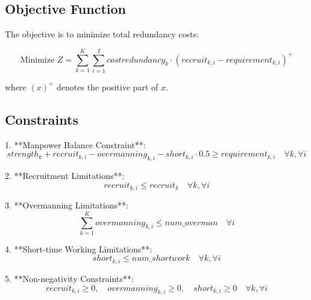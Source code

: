 \documentclass{article}
\begin{document}
\subsection*{Objective Function}
The objective is to minimize total redundancy costs:

\[
\text{Minimize } Z = \sum_{k=1}^{K} \sum_{i=1}^{I} costredundancy_{k} \cdot (recruit_{k,i} - requirement_{k,i})^+ 
\]

where $(x)^+$ denotes the positive part of $x$.

\subsection*{Constraints}

1. **Manpower Balance Constraint**:
\[
strength_{k} + recruit_{k,i} - overmanning_{k,i} - short_{k,i} \cdot 0.5 \geq requirement_{k,i} \quad \forall k, \forall i
\]

2. **Recruitment Limitations**:
\[
recruit_{k,i} \leq recruit_{k} \quad \forall k, \forall i
\]

3. **Overmanning Limitations**:
\[
\sum_{k=1}^{K} overmanning_{k,i} \leq num\_overman \quad \forall i
\]

4. **Short-time Working Limitations**:
\[
short_{k,i} \leq num\_shortwork \quad \forall k, \forall i
\]

5. **Non-negativity Constraints**:
\[
recruit_{k,i} \geq 0, \quad overmanning_{k,i} \geq 0, \quad short_{k,i} \geq 0 \quad \forall k, \forall i
\]
\end{document}
